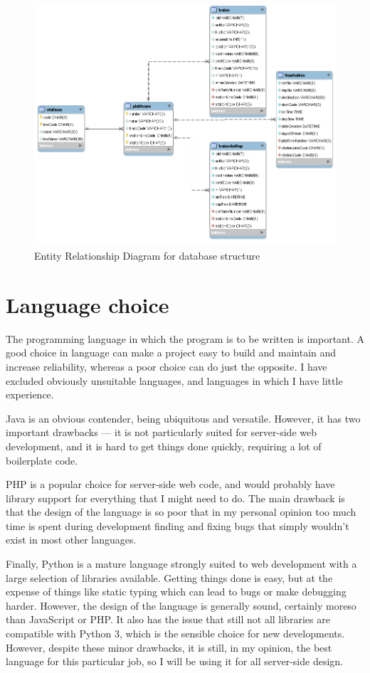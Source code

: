 \documentclass[a4paper,12pt]{report}
\begin{document}
\begin{figure}[h]
  \centering
  \includegraphics[width=\linewidth]{erd}
  \caption{Entity Relationship Diagram for database structure}
  \label{fig:erd}
\end{figure}

\section{Language choice}

The programming language in which the program is to be written is important. A
good choice in language can make a project easy to build and maintain and
increase reliability, whereas a poor choice can do just the opposite. I have
excluded obviously unsuitable languages, and languages in which I have little
experience.

Java is an obvious contender, being ubiquitous and versatile. However, it has
two important drawbacks --- it is not particularly suited for server-side web
development, and it is hard to get things done quickly, requiring a lot of
boilerplate code.

PHP is a popular choice for server-side web code, and would probably have
library support for everything that I might need to do. The main drawback is
that the design of the language is so poor that in my personal opinion too much
time is spent during development finding and fixing bugs that simply wouldn't
exist in most other languages.

Finally, Python is a mature language strongly suited to web development with a
large selection of libraries available. Getting things done is easy, but at the
expense of things like static typing which can lead to bugs or make debugging
harder. However, the design of the language is generally sound, certainly
moreso than JavaScript or PHP. It also has the issue that still not all
libraries are compatible with Python 3, which is the sensible choice for new
developments. However, despite these minor drawbacks, it is still, in my
opinion, the best language for this particular job, so I will be using it for
all server-side design.
\end{document}
